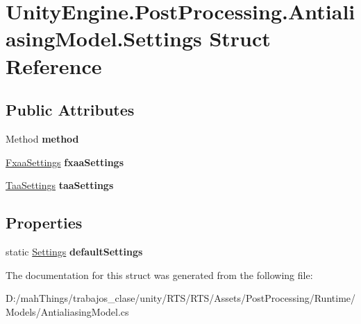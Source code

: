 \hypertarget{struct_unity_engine_1_1_post_processing_1_1_antialiasing_model_1_1_settings}{}\section{Unity\+Engine.\+Post\+Processing.\+Antialiasing\+Model.\+Settings Struct Reference}
\label{struct_unity_engine_1_1_post_processing_1_1_antialiasing_model_1_1_settings}
\subsection*{Public Attributes}
\begin{DoxyCompactItemize}
\item 
\mbox{\label{struct_unity_engine_1_1_post_processing_1_1_antialiasing_model_1_1_settings_a290930e87c63130ce62f3329d892ef30}} 
Method {\bfseries method}
\item 
\mbox{\label{struct_unity_engine_1_1_post_processing_1_1_antialiasing_model_1_1_settings_ae69900a58d52b60e6bd31feb3cccb3e5}} 
\mbox{\hyperlink{struct_unity_engine_1_1_post_processing_1_1_antialiasing_model_1_1_fxaa_settings}{Fxaa\+Settings}} {\bfseries fxaa\+Settings}
\item 
\mbox{\label{struct_unity_engine_1_1_post_processing_1_1_antialiasing_model_1_1_settings_aa4ac4787db6aca3c7a806212e9f88e68}} 
\mbox{\hyperlink{struct_unity_engine_1_1_post_processing_1_1_antialiasing_model_1_1_taa_settings}{Taa\+Settings}} {\bfseries taa\+Settings}
\end{DoxyCompactItemize}
\subsection*{Properties}
\begin{DoxyCompactItemize}
\item 
\mbox{\label{struct_unity_engine_1_1_post_processing_1_1_antialiasing_model_1_1_settings_a4a4c39cef618cb3485000208fe831295}} 
static \mbox{\hyperlink{struct_unity_engine_1_1_post_processing_1_1_antialiasing_model_1_1_settings}{Settings}} {\bfseries default\+Settings}
\end{DoxyCompactItemize}


The documentation for this struct was generated from the following file\+:\begin{DoxyCompactItemize}
\item 
D\+:/mah\+Things/trabajos\+\_\+clase/unity/\+R\+T\+S/\+R\+T\+S/\+Assets/\+Post\+Processing/\+Runtime/\+Models/Antialiasing\+Model.\+cs\end{DoxyCompactItemize}
